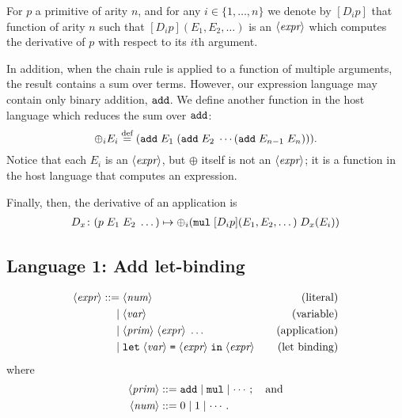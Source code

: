 \documentclass[11pt, a4paper]{article}
\newcommand{\isdef}{\mathrel{\stackrel{\text{def}}{=}}}
\begin{document}
For $p$ a primitive of arity $n$, and for any $i\in\{1, \dotsc, n\}$ we
denote by $[D_ip]$ that function of arity $n$ such that
$[D_ip](E_1, E_2, \dotsc)$ is an $\langle\textit{expr}\rangle$ which computes the derivative
of $p$ with respect to its $i$th argument.

In addition, when the chain rule is applied to a function of multiple
arguments, the result contains a sum over terms. However, our
expression language may contain only binary addition, $\texttt{add}$. We
define another function in the host language which reduces the sum
over $\texttt{add}$:
\begin{equation*}
  \oplus_i E_i \isdef (\proc{add}\; E_1\; (\proc{add}\; E_2\; \dotsb (\proc{add}\;
  E_{n-1}\; E_n))). 
\end{equation*}
Notice that each $E_i$ is an $\langle\textit{expr}\rangle$, but $\oplus$ itself is not an
$\langle\textit{expr}\rangle$; it is a function in the host language that computes an
expression.

Finally, then, the derivative of an application is
\begin{equation*}
  \begin{aligned}
    D_x \colon (p\; E_1\; E_2\; \dotsc)
                 \mapsto \oplus_i
                   (\texttt{mul}\; [D_ip](E_1, E_2, \dotsc)\;  
                   D_x(E_i))
  \end{aligned}
\end{equation*}

\subsection{Language 1: Add let-binding}

\begin{equation*}
  \begin{aligned}
    \langle\textit{expr}\rangle  ::= {} & \langle\textit{num}\rangle &&& \text{(literal)} \\
             \mid {} & \langle\textit{var}\rangle  &&& \text{(variable)} \\
             \mid {} & \langle\textit{prim}\rangle \; \langle\textit{expr}\rangle \; \dotsc  &&& \text{(application)}
    \\
             \mid {} & \texttt{let}\;\langle\textit{var}\rangle\;\texttt{=}\;\langle\textit{expr}\rangle\;\texttt{in}\;\langle\textit{expr}\rangle &&& \text{(let binding)}
  \end{aligned}
\end{equation*}
where
\begin{equation*}
  \begin{aligned}
    \langle\textit{prim}\rangle ::= {}& \texttt{add} \mid \texttt{mul} \mid \dotsb; \quad\text{and} \\
    \langle\textit{num}\rangle ::= {}& 0 \mid 1 \mid \dotsb.
  \end{aligned}
\end{equation*}
\end{document}
